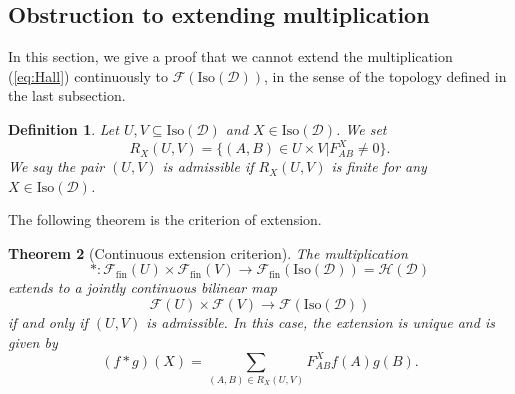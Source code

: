 \documentclass[a4paper,12pt]{amsart}
\numberwithin{equation}{section}
\newtheorem{theorem}{Theorem}[section]
\newtheorem{definition}[theorem]{Definition}
\newcommand{\Iso}{\mathrm{Iso}}
\newcommand{\1}{\mathbf{1}}
\newcommand{\fin}{\mathrm{fin}}
\begin{document}
\subsection{Obstruction to extending multiplication}
In this section, we give a proof that we cannot extend the multiplication (\ref{eq:Hall}) continuously to $\mathscr{F}(\Iso(\mathcal{D}))$, in the sense of the topology defined in the last subsection.
\begin{definition}
    Let $U,V\subseteq\Iso(\mathcal{D})$ and $X\in\Iso(\mathcal{D})$. We set
    \[R_X(U,V)=\{(A,B)\in U\times V|F_{AB}^X\neq0\}.\]
    We say the pair $(U,V)$ is \emph{admissible} if $R_X(U,V)$ is finite for any $X\in\Iso(\mathcal{D})$.
\end{definition}
The following theorem is the criterion of extension.
\begin{theorem}[Continuous extension criterion]\label{continuous extension criterion}
    The multiplication
    \[*:\mathscr{F}_{\fin}(U)\times\mathscr{F}_{\fin}(V)\rightarrow\mathscr{F}_{\fin}(\Iso(\mathcal{D}))=\mathcal{H}(\mathcal{D})\]
    extends to a jointly continuous bilinear map
    \[\mathscr{F}(U)\times\mathscr{F}(V)\rightarrow\mathscr{F}(\Iso(\mathcal{D}))\]
    if and only if $(U,V)$ is admissible. In this case, the extension is unique and is given by
    \[(f*g)(X)=\sum_{(A,B)\in R_X(U,V)}F_{AB}^Xf(A)g(B).\]
\end{theorem}
\end{document}
